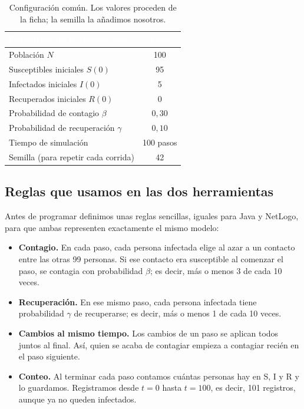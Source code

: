 \documentclass[11pt,a4paper]{article}
\renewcommand{\arraystretch}{1.08}
\newcommand{\cab}[1]{\textbf{\textcolor{white}{#1}}}
\newcommand{\tabestilo}{\arrayrulecolor{borderblue}\setlength{\arrayrulewidth}{0.75pt}\renewcommand{\arraystretch}{1.2}}
\begin{document}
\begin{table}[H]
\centering\tabestilo
\begin{tabularx}{\textwidth}{|Y|c|}
\hline{}\cab{Parámetro de la corrida base} & \cab{Valor} \\ \hline
Población $N$ & 100 \\ \hline
{}Susceptibles iniciales $S(0)$ & 95 \\ \hline
Infectados iniciales $I(0)$ & 5 \\ \hline
{}Recuperados iniciales $R(0)$ & 0 \\ \hline
Probabilidad de contagio $\beta$ & $0{,}30$ \\ \hline
{}Probabilidad de recuperación $\gamma$ & $0{,}10$ \\ \hline
Tiempo de simulación & 100 pasos \\ \hline
{}Semilla (para repetir cada corrida) & 42 \\ \hline
\end{tabularx}
\caption{Configuración común. Los valores proceden de la ficha; la semilla la añadimos nosotros.}
\label{tab:parametros}
\end{table}

\subsection{Reglas que usamos en las dos herramientas}
Antes de programar definimos unas reglas sencillas, iguales para Java y NetLogo, para que ambas representen exactamente el mismo modelo:

\begin{itemize}
  \item \textbf{Contagio.} En cada paso, cada persona infectada elige al azar a un contacto entre las otras 99 personas. Si ese contacto era susceptible al comenzar el paso, se contagia con probabilidad $\beta$; es decir, más o menos 3 de cada 10 veces.

  \item \textbf{Recuperación.} En ese mismo paso, cada persona infectada tiene probabilidad $\gamma$ de recuperarse; es decir, más o menos 1 de cada 10 veces.

  \item \textbf{Cambios al mismo tiempo.} Los cambios de un paso se aplican todos juntos al final. Así, quien se acaba de contagiar empieza a contagiar recién en el paso siguiente.

  \item \textbf{Conteo.} Al terminar cada paso contamos cuántas personas hay en S, I y R y lo guardamos. Registramos desde $t=0$ hasta $t=100$, es decir, 101 registros, aunque ya no queden infectados.
\end{itemize}
\end{document}
